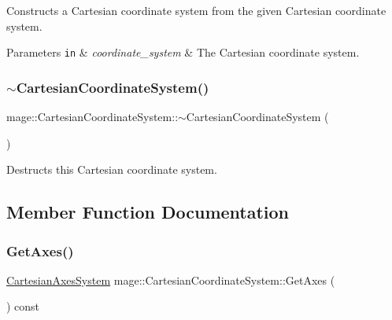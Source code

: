 Constructs a Cartesian coordinate system from the given Cartesian coordinate system.


\begin{DoxyParams}[1]{Parameters}
\mbox{\tt in}  & {\em coordinate\+\_\+system} & The Cartesian coordinate system. \\
\hline
\end{DoxyParams}
\hypertarget{structmage_1_1_cartesian_coordinate_system_a86effcef63e455323c194063c0f1fd46}{}\label{structmage_1_1_cartesian_coordinate_system_a86effcef63e455323c194063c0f1fd46} 
\subsubsection{\texorpdfstring{$\sim$\+Cartesian\+Coordinate\+System()}{~CartesianCoordinateSystem()}}
{\footnotesize\ttfamily mage\+::\+Cartesian\+Coordinate\+System\+::$\sim$\+Cartesian\+Coordinate\+System (\begin{DoxyParamCaption}{ }\end{DoxyParamCaption})\hspace{0.3cm}{\ttfamily [default]}}

Destructs this Cartesian coordinate system. 

\subsection{Member Function Documentation}
\hypertarget{structmage_1_1_cartesian_coordinate_system_a291ba9d21e78af511bdd6358b3502eb4}{}\label{structmage_1_1_cartesian_coordinate_system_a291ba9d21e78af511bdd6358b3502eb4} 
\subsubsection{\texorpdfstring{Get\+Axes()}{GetAxes()}}
{\footnotesize\ttfamily \hyperlink{structmage_1_1_cartesian_axes_system}{Cartesian\+Axes\+System} mage\+::\+Cartesian\+Coordinate\+System\+::\+Get\+Axes (\begin{DoxyParamCaption}{ }\end{DoxyParamCaption}) const}

